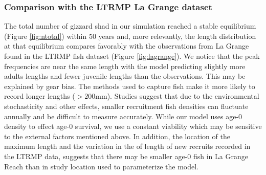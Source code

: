 \documentclass[preprint,review,12pt,authoryear]{elsarticle}
\begin{document}
\subsubsection{Comparison with the LTRMP La Grange dataset}
The total number of gizzard shad in our simulation reached a stable equilibrium (Figure \ref{fig:ntotal}) within 50 years and, more relevantly, the length distribution at that equilibrium compares favorably with the observations from La Grange found in the LTRMP fish dataset (Figure \ref{fig:lagrange}). 
We notice that the peak frequencies are near the same length with the model predicting slightly more adults lengths and fewer juvenile lengths than the observations. 
This may be explained by gear bias.
The methods used to capture fish make it more likely to record longer lengths ($>200$mm). 
Studies suggest that due to the environmental stochasticity and other effects, smaller recruitment fish densities can fluctuate annually and be difficult to measure accurately. 
While our model uses age-0 density to effect age-0 survival, we use a constant viability which may be sensitive to the external factors mentioned above.
In addition, the location of the maximum length and the variation in the of length of new recruits recorded in the LTRMP data, suggests that there may be smaller age-0 fish in La Grange Reach than in study location \citep{michaletz2017variation} used to parameterize the model.  
\end{document}
